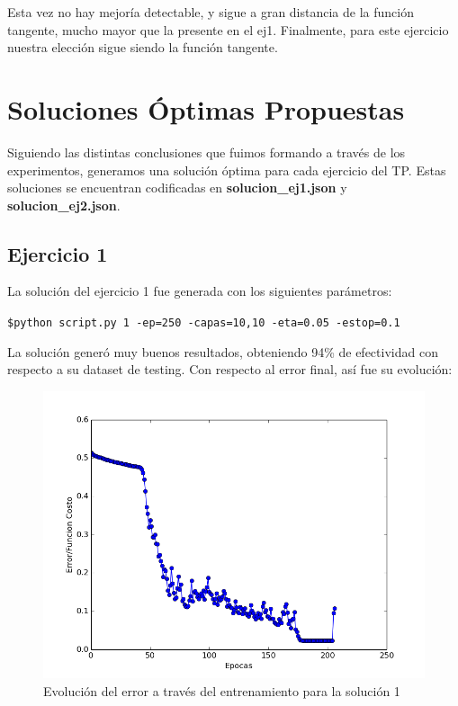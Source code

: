 Esta vez no hay mejoría detectable, y sigue a gran distancia de la función tangente, mucho mayor que la presente en el ej1. 
Finalmente, para este ejercicio nuestra elección sigue siendo la función tangente.


\newpage
\section{Soluciones Óptimas Propuestas}

Siguiendo las distintas conclusiones que fuimos formando a través de los experimentos, generamos una solución óptima para cada ejercicio del TP. Estas soluciones se encuentran codificadas en \textbf{solucion\_ej1.json} y \textbf{solucion\_ej2.json}.

\subsection{Ejercicio 1}
La solución del ejercicio 1 fue generada con los siguientes parámetros:

\texttt{\$python script.py 1 -ep=250 -capas=10,10 -eta=0.05 -estop=0.1}

La solución generó muy buenos resultados, obteniendo 94\% de efectividad con respecto a su dataset de testing.
Con respecto al error final, así fue su evolución:

\begin{figure}[h]
  \begin{center}
  \includegraphics[scale=0.50]{graficos/solucion_ej1.png}
  \caption{Evolución del error a través del entrenamiento para la solución 1}
  \end{center}
\end{figure}

